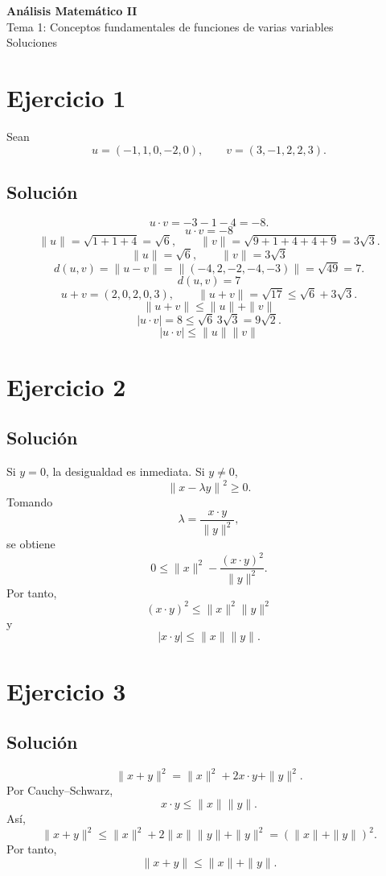 \documentclass[11pt,a4paper]{article}
\begin{document}
\begin{center}
{\LARGE\bfseries Análisis Matemático II}\\[0.4em]
{\Large Tema 1: Conceptos fundamentales de funciones de varias variables}\\[0.4em]
{\large Soluciones}
\end{center}

\section{Ejercicio 1}
Sean
\[
u=(-1,1,0,-2,0),\qquad v=(3,-1,2,2,3).
\]
\subsection{Solución}
\[
u\cdot v=-3-1-4=-8.
\]
\[
\boxed{u\cdot v=-8}
\]
\[
\|u\|=\sqrt{1+1+4}=\sqrt6,
\qquad
\|v\|=\sqrt{9+1+4+4+9}=3\sqrt3.
\]
\[
\boxed{\|u\|=\sqrt6,\qquad \|v\|=3\sqrt3}
\]
\[
d(u,v)=\|u-v\|
=\|(-4,2,-2,-4,-3)\|
=\sqrt{49}=7.
\]
\[
\boxed{d(u,v)=7}
\]
\[
u+v=(2,0,2,0,3),
\qquad
\|u+v\|=\sqrt{17}\leq \sqrt6+3\sqrt3.
\]
\[
\boxed{\|u+v\|\leq\|u\|+\|v\|}
\]
\[
|u\cdot v|=8\leq \sqrt6\,3\sqrt3=9\sqrt2.
\]
\[
\boxed{|u\cdot v|\leq\|u\|\|v\|}
\]

\section{Ejercicio 2}
\subsection{Solución}
Si \(y=0\), la desigualdad es inmediata. Si \(y\neq0\),
\[
\left\|x-\lambda y\right\|^2\geq0.
\]
Tomando
\[
\lambda=\frac{x\cdot y}{\|y\|^2},
\]
se obtiene
\[
0\leq
\|x\|^2-\frac{(x\cdot y)^2}{\|y\|^2}.
\]
Por tanto,
\[
(x\cdot y)^2\leq \|x\|^2\|y\|^2
\]
y
\[
\boxed{|x\cdot y|\leq\|x\|\|y\|}.
\]

\section{Ejercicio 3}
\subsection{Solución}
\[
\|x+y\|^2
=\|x\|^2+2x\cdot y+\|y\|^2.
\]
Por Cauchy--Schwarz,
\[
x\cdot y\leq \|x\|\|y\|.
\]
Así,
\[
\|x+y\|^2
\leq
\|x\|^2+2\|x\|\|y\|+\|y\|^2
=(\|x\|+\|y\|)^2.
\]
Por tanto,
\[
\boxed{\|x+y\|\leq\|x\|+\|y\|}.
\]
\end{document}
